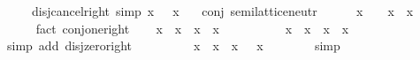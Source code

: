 \begin{isabellebody}
\ \ \ \ \ disj{\isacharunderscore}{\kern0pt}cancel{\isacharunderscore}{\kern0pt}right\ {\isacharbrackleft}{\kern0pt}simp{\isacharbrackright}{\kern0pt}{\isacharcolon}{\kern0pt}\ {\isacartoucheopen}x\ \isactrlbold {\isasymsqunion}\ \isactrlbold {\isacharminus}{\kern0pt}\ x\ {\isacharequal}{\kern0pt}\ \isanewline
{}\isanewline
\isanewline
{}\isamarkupfalse%
\ conj{\isacharcolon}{\kern0pt}\ semilattice{\isacharunderscore}{\kern0pt}neutr\ {\isacartoucheopen}{\isacharparenleft}{\kern0pt}\isactrlbold {\isasymsqinter}{\isacharparenright}{\kern0pt}{\isacartoucheclose}\ {\isacartoucheopen}\isanewline
%
\isadelimproof
%
\endisadelimproof
%
\isatagproof
{}\isamarkupfalse%
\isanewline
\ \ \isamarkupfalse%
\ {\isachardoublequoteopen}x\ \isactrlbold {\isasymsqinter}\ \ {\isacharequal}{\kern0pt}\ x{\isachardoublequoteclose}\ \ x\ \isanewline
\ \ \ \ \isamarkupfalse%
\ {\isacharparenleft}{\kern0pt}fact\ conj{\isacharunderscore}{\kern0pt}one{\isacharunderscore}{\kern0pt}right{\isacharparenright}{\kern0pt}\isanewline
\ \ \isamarkupfalse%
\ {\isachardoublequoteopen}x\ \isactrlbold {\isasymsqinter}\ x\ {\isacharequal}{\kern0pt}\ x{\isachardoublequoteclose}\ \ x\isanewline
\ \ \isamarkupfalse%
\ {\isacharminus}{\kern0pt}\isanewline
\ \ \ \ \isamarkupfalse%
\ {\isachardoublequoteopen}x\ \isactrlbold {\isasymsqinter}\ x\ {\isacharequal}{\kern0pt}\ {\isacharparenleft}{\kern0pt}x\ \isactrlbold {\isasymsqinter}\ x{\isacharparenright}{\kern0pt}\ \isactrlbold {\isasymsqunion}\ \isanewline
\ \ \ \ \ \ \isamarkupfalse%
\ {\isacharparenleft}{\kern0pt}simp\ add{\isacharcolon}{\kern0pt}\ disj{\isacharunderscore}{\kern0pt}zero{\isacharunderscore}{\kern0pt}right{\isacharparenright}{\kern0pt}\isanewline
\ \ \ \ \isamarkupfalse%
\ \isamarkupfalse%
\ {\isachardoublequoteopen}{\isasymdots}\ {\isacharequal}{\kern0pt}\ {\isacharparenleft}{\kern0pt}x\ \isactrlbold {\isasymsqinter}\ x{\isacharparenright}{\kern0pt}\ \isactrlbold {\isasymsqunion}\ {\isacharparenleft}{\kern0pt}x\ \isactrlbold {\isasymsqinter}\ \isactrlbold {\isacharminus}{\kern0pt}\ x{\isacharparenright}{\kern0pt}{\isachardoublequoteclose}\isanewline
\ \ \ \ \ \ \isamarkupfalse%
\ simp\isanewline
\ \ \ \ \isamarkupfalse%

\end{isabellebody}
